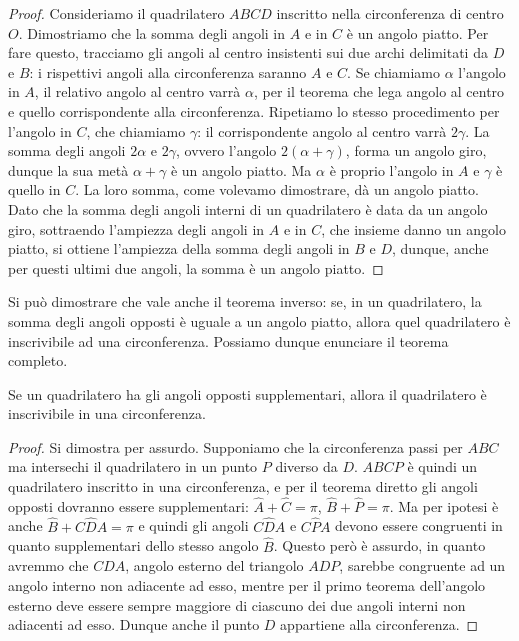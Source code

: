 \begin{proof}
Consideriamo il quadrilatero $ABCD$ inscritto nella circonferenza di 
centro $O$. Dimostriamo che la somma degli angoli in $A$ e in $C$ è 
un angolo piatto. Per fare questo, tracciamo gli angoli al centro 
insistenti sui due archi delimitati da $D$ e $B$: i rispettivi angoli 
alla circonferenza saranno $A$ e $C$. Se chiamiamo $\alpha$ l'angolo 
in $A$, il relativo angolo al centro varrà $\alpha$, per il teorema 
che lega angolo al centro e quello corrispondente alla circonferenza. 
Ripetiamo lo stesso procedimento per l'angolo in $C$, che chiamiamo 
$\gamma$: il corrispondente angolo al centro varrà $2\gamma$. La 
somma degli angoli $2\alpha$ e $2\gamma$, ovvero l'angolo 
$2(\alpha+\gamma)$, forma un angolo giro, dunque la sua metà 
$\alpha+\gamma$ è un angolo piatto. Ma $\alpha$ è proprio l'angolo in 
$A$ e $\gamma$ è quello in $C$. La loro somma, come volevamo 
dimostrare, dà un angolo piatto. Dato che la somma degli angoli 
interni di un quadrilatero è data da un angolo giro, sottraendo 
l'ampiezza degli angoli in $A$ e in $C$, che insieme danno un angolo 
piatto, si ottiene l'ampiezza della somma degli angoli in $B$ e $D$, 
dunque, anche per questi ultimi due angoli, la somma è un angolo 
piatto.
\end{proof}

Si può dimostrare che vale anche il teorema inverso: se, in un 
quadrilatero, la somma degli angoli opposti è uguale a un angolo 
piatto, allora quel quadrilatero è inscrivibile ad una circonferenza.
Possiamo dunque enunciare il teorema completo.

\begin{teorema}
Se un quadrilatero ha gli angoli opposti supplementari, allora il 
quadrilatero è inscrivibile in una circonferenza.
\end{teorema}


\begin{inaccessibleblock}
 \begin{figure}[htb]
	\centering
\end{figure}
\end{inaccessibleblock}

\begin{proof}
Si dimostra per assurdo. Supponiamo che la circonferenza passi per 
$ABC$ ma intersechi il quadrilatero in un punto $P$ diverso da $D$. 
$ABCP$ è quindi un quadrilatero inscritto in una circonferenza, e per 
il teorema diretto gli angoli opposti dovranno essere supplementari: 
$\widehat{A}+\widehat{C}=\pi$, $\widehat{B}+\widehat{P}=\pi$. Ma per 
ipotesi è anche $\widehat{B}+C\widehat{D}A=\pi$ e quindi gli angoli 
$C\widehat{D}A$ e $C\widehat{P}A$ devono essere congruenti in quanto 
supplementari dello stesso angolo $\widehat{B}$. Questo però è 
assurdo, in quanto avremmo che $C\widehat{D}A$, angolo esterno del 
triangolo $ADP$, sarebbe congruente ad un angolo interno non 
adiacente ad esso, mentre per il primo teorema dell'angolo esterno 
deve essere sempre maggiore di ciascuno dei due angoli interni non 
adiacenti ad esso. Dunque anche il punto $D$ appartiene alla 
circonferenza.
\end{proof}

